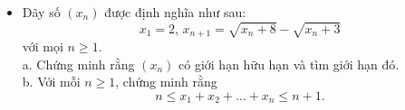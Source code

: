 \documentclass[11pt]{scrartcl}
\begin{document}
\begin{itemize}[label=, leftmargin=0em, itemsep=-0em]

    \item \begin{btvn}
        Dãy số $(x_n)$ được định nghĩa như sau:
$$x_1=2,\, x_{n+1}=\sqrt{x_n+8}-\sqrt{x_n+3}$$ với mọi $n\geq 1$.\\
a. Chứng minh rằng $(x_n)$ có giới hạn hữu hạn và tìm giới hạn đó.\\
b. Với mỗi $n\geq 1$, chứng minh rằng
$$n\leq x_1+x_2+\dots +x_n\leq n+1.$$
    \end{btvn}

\end{itemize}
\end{document}

